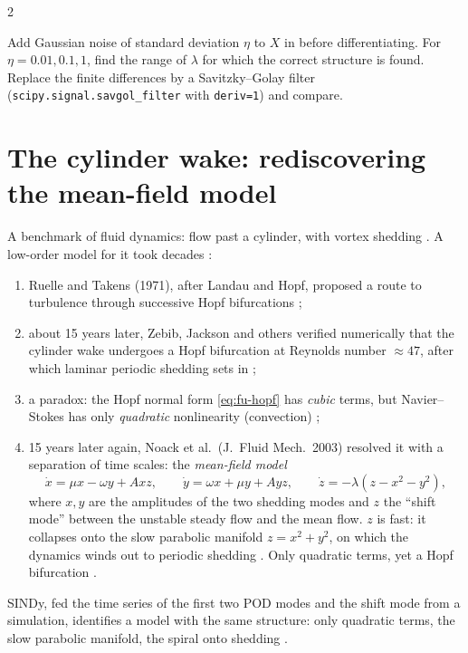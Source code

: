 \begin{paracol}{2}
\begin{exercise}
Add Gaussian noise of standard deviation $\eta$ to $X$ in  before differentiating.
For $\eta=0.01,0.1,1$, find the range of $\lambda$ for which the correct structure is found. Replace the
finite differences by a Savitzky--Golay filter (\texttt{scipy.signal.savgol\_filter} with \texttt{deriv=1})
and compare.
\end{exercise}

\section{The cylinder wake: rediscovering the mean-field model}\label{sec:si-cylinder}

\begin{casestudy}
A benchmark of fluid dynamics: flow past a cylinder, with vortex shedding . A low-order model
for it took decades :
\begin{enumerate}
  \item Ruelle and Takens (1971), after Landau and Hopf, proposed a route to turbulence through successive
        Hopf bifurcations ;
  \item about 15 years later, Zebib, Jackson and others verified numerically that the cylinder wake
        undergoes a Hopf bifurcation at Reynolds number $\approx47$, after which laminar periodic shedding
        sets in ;
  \item a paradox: the Hopf normal form \eqref{eq:fu-hopf} has \emph{cubic} terms, but Navier--Stokes has
        only \emph{quadratic} nonlinearity (convection) ;
  \item 15 years later again, Noack et al.\ (J.\ Fluid Mech.\ 2003) resolved it with a separation of time
        scales: the \emph{mean-field model}
        \begin{equation}\label{eq:si-meanfield}
          \dot x=\mu x-\omega y+Axz,\qquad \dot y=\omega x+\mu y+Ayz,\qquad \dot z=-\lambda(z-x^2-y^2),
        \end{equation}
        where $x,y$ are the amplitudes of the two shedding modes and $z$ the ``shift mode'' between the
        unstable steady flow and the mean flow. $z$ is fast: it collapses onto the slow parabolic manifold
        $z=x^2+y^2$, on which the dynamics winds out to periodic shedding .
        Only quadratic terms, yet a Hopf bifurcation .
\end{enumerate}
SINDy, fed the time series of the first two POD modes and the shift mode from a simulation, identifies a
model with the same structure: only quadratic terms, the slow parabolic manifold, the spiral onto shedding
.
\end{casestudy}


\end{paracol}
